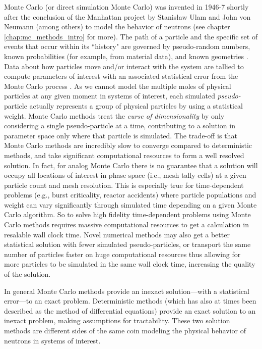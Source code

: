 Monte Carlo (or direct simulation Monte Carlo) was invented in 1946-7 shortly after the conclusion of the Manhattan project by Stanisław Ulam and John von Neumann (among others) to model the behavior of neutrons (see chapter \ref{chap:mc_methods_intro} for more).
The path of a particle and the specific set of events that occur within its ``history" are governed by pseudo-random numbers, known probabilities (for example, from material data), and known geometries \cite{lux_1998}.
Data about how particles move and/or interact with the system are tallied to compute parameters of interest with an associated statistical error from the Monte Carlo process \cite{kayla_phd}.
As we cannot model the multiple moles of physical particles at any given moment in systems of interest, each simulated \textit{pseudo-}particle actually represents a group of physical particles by using a statistical weight.
Monte Carlo methods treat the \textit{curse of dimensionality} by only considering a single pseudo-particle at a time, contributing to a solution in parameter space only where that particle is simulated.
The trade-off is that Monte Carlo methods are incredibly slow to converge compared to deterministic methods, and take significant computational resources to form a well resolved solution.
In fact, for analog Monte Carlo there is no guarantee that a solution will occupy all locations of interest in phase space (i.e., mesh tally cells) at a given particle count and mesh resolution.
This is especially true for time-dependent problems (e.g., burst criticality, reactor accidents) where particle populations and weight can vary significantly through simulated time depending on a given Monte Carlo algorithm.
So to solve high fidelity time-dependent problems using Monte Carlo methods requires massive computational resources to get a calculation in resalable wall clock time.
Novel numerical methods may also get a better statistical solution with fewer simulated pseudo-particles, or transport the same number of particles faster on huge computational resources thus allowing for more particles to be simulated in the same wall clock time, increasing the quality of the solution.

In general Monte Carlo methods provide an inexact solution---with a statistical error---to an exact problem.
Deterministic methods (which has also at times been described as the method of differential equations) provide an exact solution to an inexact problem, making assumptions for tractability.
These two solution methods are different sides of the same coin modeling the physical behavior of neutrons in systems of interest.

